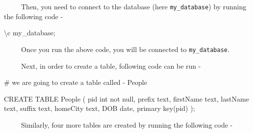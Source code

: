 \documentclass[
  letterpaper,
  DIV=11,
  numbers=noendperiod]{scrreprt}
\newenvironment{Shaded}{\begin{snugshade}}{\end{snugshade}}
\newcommand{\CommentTok}[1]{\textcolor[rgb]{0.37,0.37,0.37}{#1}}
\newcommand{\FunctionTok}[1]{\textcolor[rgb]{0.28,0.35,0.67}{#1}}
\newcommand{\NormalTok}[1]{\textcolor[rgb]{0.00,0.23,0.31}{#1}}
\begin{document}
~~~~~Then, you need to connect to the database (here
\texttt{my\_database}) by running the following code -

\begin{Shaded}
\begin{Highlighting}[]
\NormalTok{\textbackslash{}c my\_database;}
\end{Highlighting}
\end{Shaded}

~~~~~Once you run the above code, you will be connected to
\texttt{my\_database}.

~~~~~Next, in order to create a table, following code can be run -

\begin{Shaded}
\begin{Highlighting}[]
\CommentTok{\# we are going to create a table called {-} People}

\NormalTok{CREATE TABLE }\FunctionTok{People}\NormalTok{ (}
\NormalTok{ pid int not null,}
\NormalTok{ prefix text,}
\NormalTok{ firstName text,}
\NormalTok{ lastName text,}
\NormalTok{ suffix text,}
\NormalTok{ homeCity text,}
\NormalTok{ DOB date,}
\NormalTok{ primary }\FunctionTok{key}\NormalTok{(pid)}
\NormalTok{);}
\end{Highlighting}
\end{Shaded}

~~~~~Similarly, four more tables are created by running the following
code -
\end{document}
